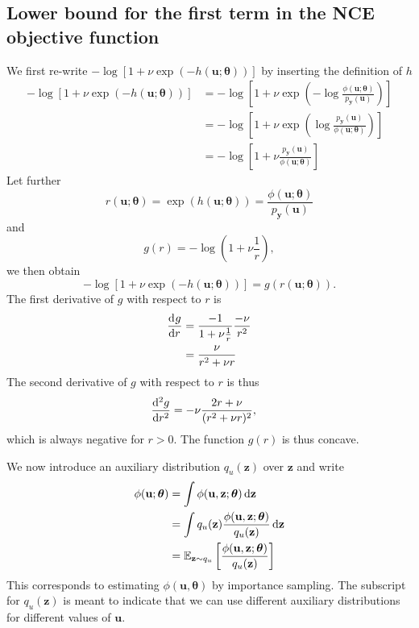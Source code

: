 \documentclass[11pt, oneside]{article}
\newcommand{\thetab}{{\boldsymbol{\theta}}}
\newcommand{\pnn}{\phi}
\newcommand{\pnoise}{p_{ \mathbf y}}
\renewcommand{\u}{{\mathbf u}}
\newcommand{\z}{{\mathbf z}}
\newcommand{\E}{\mathbb{E}}
\begin{document}
\subsection{Lower bound for the first term in the NCE objective function}
We first re-write $ - \log [1+\nu \exp(-h(\u;\thetab))]$ by inserting the definition of $h$
\begin{align}
  - \log [1+\nu \exp(-h(\u;\thetab))] & =  - \log \left[1+\nu \exp \left(- \log \frac{\pnn(\u;\thetab)}{\pnoise(\u)}\right) \right]\\
  & =  - \log \left[1+\nu \exp \left( \log \frac{\pnoise(\u)}{\pnn(\u;\thetab)}\right) \right]\\
  & =  - \log \left[1+\nu  \frac{\pnoise(\u)}{\pnn(\u;\thetab)} \right] 
\end{align}
Let further
\begin{equation}
  r(\u;\thetab) = \exp(h(\u; \thetab)) = \frac{\pnn(\u;\thetab)}{\pnoise(\u)}
  \label{eq:r-def}
\end{equation}
and
\begin{equation}
  g(r) = -\log \left(1+\nu \frac{1}{r} \right),
\end{equation}
we then obtain
\begin{equation}
  - \log [1+\nu \exp(-h(\u;\thetab))]  = g(r(\u; \thetab)).
\end{equation}
The first derivative of $g$ with respect to $r$ is
\begin{align}
\dod{g}{r} &= \frac{-1}{1+\nu \frac{1}{r}}\frac{-\nu}{r^2}\\
&= \frac{\nu}{r^2+\nu r}
\end{align}
The second derivative of $g$ with respect to $r$ is thus
\begin{align}
\dod[2]{g}{r} &= -\nu \frac{2r +\nu}{(r^2+\nu r)^2},
\end{align}
which is always negative for $r>0$. The function $g(r)$ is thus concave.

We now introduce an auxiliary distribution $q_u(\z)$ over $\z$ and write
\begin{align}
  \pnn(\u; \thetab) &= \int \pnn(\u, \z;\thetab) \dif \z\\
  & = \int q_u(\z) \frac{\pnn(\u,\z; \thetab)}{q_u(\z)} \dif \z\\
  & = \E_{\z \sim q_u} \left[\frac{\pnn(\u,\z; \thetab)}{q_u(\z)}\right]
  \label{eq:phi-importance-sampling}
\end{align}
This corresponds to estimating $\pnn(\u,\thetab)$ by importance sampling. The subscript for $q_u(\z)$ is meant to indicate that we can use different auxiliary distributions for different values of $\u$.
\end{document}
